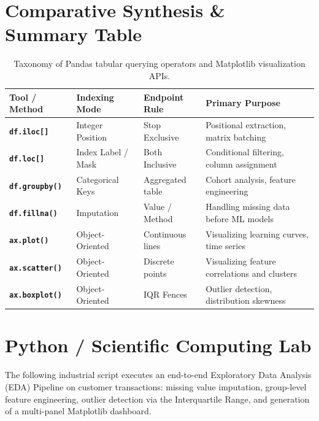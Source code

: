 \section{Comparative Synthesis \& Summary Table}

\begin{table}[htbp]
\centering
\small
\begin{tabular}{p{2.6cm} p{2.6cm} p{2.6cm} p{4.2cm}}
\hline
\textbf{Tool / Method} & \textbf{Indexing Mode} & \textbf{Endpoint Rule} & \textbf{Primary Purpose} \\
\hline
\textbf{\texttt{df.iloc[]}} & Integer Position & Stop Exclusive & Positional extraction, matrix batching \\
\textbf{\texttt{df.loc[]}} & Index Label / Mask & Both Inclusive & Conditional filtering, column assignment \\
\textbf{\texttt{df.groupby()}} & Categorical Keys & Aggregated table & Cohort analysis, feature engineering \\
\textbf{\texttt{df.fillna()}} & Imputation & Value / Method & Handling missing data before ML models \\
\textbf{\texttt{ax.plot()}} & Object-Oriented & Continuous lines & Visualizing learning curves, time series \\
\textbf{\texttt{ax.scatter()}} & Object-Oriented & Discrete points & Visualizing feature correlations and clusters \\
\textbf{\texttt{ax.boxplot()}} & Object-Oriented & IQR Fences & Outlier detection, distribution skewness \\
\hline
\end{tabular}
\caption{Taxonomy of Pandas tabular querying operators and Matplotlib visualization APIs.}
\label{tab:pandas_summary}
\end{table}

\section{Python / Scientific Computing Lab}

The following industrial script executes an end-to-end Exploratory Data Analysis (EDA) Pipeline on customer transactions: missing value imputation, group-level feature engineering, outlier detection via the Interquartile Range, and generation of a multi-panel Matplotlib dashboard.

